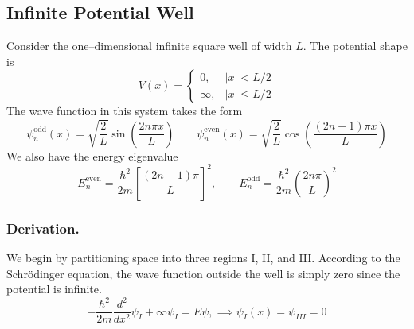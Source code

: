 \documentclass[../../../main.tex]{subfiles}
\begin{document}
\subsection{Infinite Potential Well}
Consider the one--dimensional infinite square well of width \(L\).
The potential shape is
\begin{equation*}
    V(x)=
    \begin{cases}
        0,      & |x|<L/2      \\
        \infty, & |x| \leq L/2
    \end{cases}
\end{equation*}
The wave function in this system takes the form
\begin{equation*}
    \psi_n^{\text{odd}}(x) = \sqrt{\frac{2  }{L }} \sin\left(\frac{2 n \pi x}{L}\right)
    \qquad
    \psi_n^{\text{even}}(x) =\sqrt{\frac{2 }{L }} \cos\left(\frac{(2n-1)\pi x}{L}\right)
\end{equation*}
We also have the energy eigenvalue
\begin{equation*}
    E_n^{\text{even}} = \frac{\hbar^2}{2 m} \left[\frac{(2n-1)\pi}{L}\right]^2, \qquad
    E_n^{\text{odd}} = \frac{\hbar^2}{2 m} \left(\frac{2 n \pi}{L}\right)^2
\end{equation*}

\subsubsection{Derivation.}
We begin by partitioning space into three regions I, II, and III.
According to the Schrödinger equation, the wave function outside the well is simply zero since the potential is infinite.
\begin{equation*}
    -\frac{\hbar^2 }{2m }\frac{d^2 }{dx^2 }\psi_I+\infty \psi_I=E\psi,\implies \psi_I(x)=\psi_{III}=0
\end{equation*}
\end{document}
